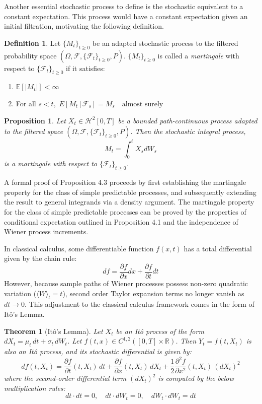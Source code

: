 \documentclass[12pt]{article}
\theoremstyle{definition}
\newtheorem{definition}{Definition}[section]
\theoremstyle{plain}
\newtheorem{theorem}{Theorem}[section]
\newtheorem{proposition}{Proposition}[section]
\theoremstyle{remark}
\begin{document}
Another essential stochastic process to define is the stochastic equivalent to a constant expectation.  This process would have a constant expectation given an initial filtration, motivating the following definition.

\begin{definition}
Let $\{ M_t\}_{t \geq 0}$ be an adapted stochastic process to the filtered probability space $(\Omega, \mathcal{F}, \{\mathcal{F}_t\}_{t \geq 0}, P)$.  $\{ M_t\}_{t \geq 0}$ is called a \textit{martingale} with respect to $\{\mathcal{F}_t\}_{t \geq 0}$ if it satisfies:
\begin{enumerate}[label=(\roman*)]
    \item $\mathbb{E} [|M_t|] <\infty$
    \item For all $s < t,$
    $ E [M_t\,|\, \mathcal{F}_s] = M_s \quad \text{almost surely}$
\end{enumerate}
\end{definition}

\begin{proposition}
Let $X_t \in  \mathcal{H}^2[0,T]$ be a bounded path-continuous process adapted to the filtered space  $(\Omega, \mathcal{F}, \{\mathcal{F}_t\}_{t \geq 0}, P)$.  Then the stochastic integral process,
\[
M_t = \int_0^tX_sdW_s
\]
is a martingale with respect to $\{\mathcal{F}_t\}_{t \geq 0}$.
\end{proposition}


 A formal proof of Proposition 4.3 proceeds by first establishing the martingale property for the class of simple predictable processes, and subsequently extending the result to general integrands via a density argument.  The martingale property for the class of simple predictable processes can be proved by the properties of conditional expectation outlined in Proposition 4.1 and the independence of Wiener process increments.


In classical calculus, some differentiable function $f(x,t)$ has a total differential given by the chain rule: 
\[
df = \frac{\partial f}{\partial x}dx + \frac{\partial f}{\partial t}dt
\]
However, because sample paths of Wiener processes possess non-zero quadratic variation ($\langle W \rangle_t = t$), second order Taylor expansion terms no longer vanish as $dt \to 0$.  This adjustment to the classical calculus framework comes in the form of It\^o's Lemma.

\begin{theorem}[It\^o's Lemma]
Let $X_t$ be an It\^o process of the form $dX_t = \mu_t \, dt + \sigma_t \, dW_t$. Let $f(t,x) \in C^{1,2}([0,T] \times \mathbb{R})$. Then $Y_t = f(t, X_t)$ is also an It\^o process, and its stochastic differential is given by:
\[
df(t, X_t) = \frac{\partial f}{\partial t}(t, X_t) \, dt + \frac{\partial f}{\partial x}(t, X_t) \, dX_t + \frac{1}{2} \frac{\partial^2 f}{\partial x^2}(t, X_t) \, (dX_t)^2
\]
where the second-order differential term $(dX_t)^2$ is computed by the below multiplication rules:
\[
dt \cdot dt = 0, \quad dt \cdot dW_t = 0, \quad dW_t \cdot dW_t = dt
\]
\end{theorem}
\end{document}

